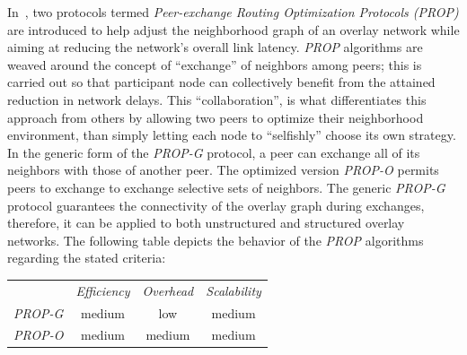 In~\cite{QCYCZ2007}, two protocols termed 
\emph{Peer-exchange Routing Optimization Protocols (PROP)} 
are introduced to help adjust the neighborhood graph of an overlay network
while aiming at reducing the network's overall link latency.
\emph{PROP} algorithms are weaved around the concept of 
``exchange'' of neighbors among peers; 
this is carried out so that participant node can collectively 
benefit from the attained reduction in network delays. 
This ``collaboration'', is what differentiates this approach 
from others by allowing two peers to optimize
their neighborhood environment, than simply letting each node to ``selfishly''
choose its own strategy. 
In the generic form of the \emph{PROP-G} protocol,
a peer can exchange all of its
neighbors with those of another peer. 
The optimized version \emph{PROP-O} permits peers to 
exchange to exchange selective sets of neighbors.
The generic \emph{PROP-G} protocol guarantees
the connectivity of the overlay graph during exchanges, 
therefore, it can be applied
to both unstructured and structured overlay networks.
The following table depicts the behavior of the \emph{PROP} 
algorithms regarding the stated criteria:
\begin{center}
{\footnotesize
\begin{tabular}{rccc}
\multicolumn{1}{r}{} &
\multicolumn{1}{c}{\emph{Efficiency}} &
\multicolumn{1}{c}{\emph{Overhead}} &
\multicolumn{1}{c}{\emph{Scalability}}
\\
\cline{2-4}
\emph{PROP-G} &
medium &
low &
medium \\
\emph{PROP-O} &
medium &
medium &
medium \\
\end{tabular}
}
\end{center}

